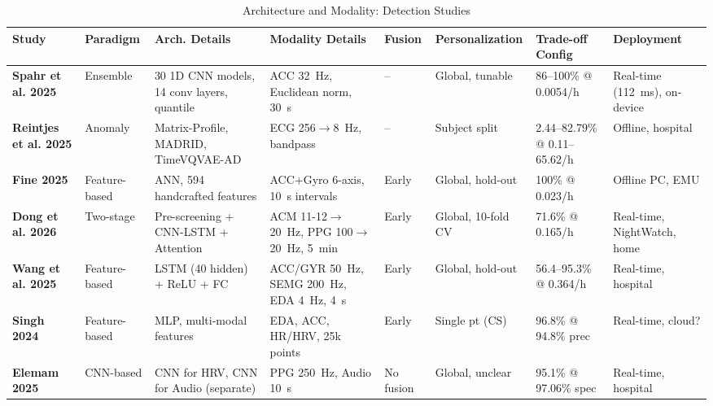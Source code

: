 
\begin{landscape}
\begin{table}[htbp]
\centering
\footnotesize
\caption{Architecture and Modality: Detection Studies}
\label{tab:detection-architecture}
\setlength{\tabcolsep}{3pt}
\renewcommand{\arraystretch}{1.4}
\begin{tabularx}{\linewidth}{@{} l X X X X X X X @{}}
\toprule
\textbf{Study} & \textbf{Paradigm} & \textbf{Arch. Details} & \textbf{Modality Details} & \textbf{Fusion} & \textbf{Personalization} & \textbf{Trade-off Config} & \textbf{Deployment} \\
\midrule
\textbf{Spahr et al. 2025} & Ensemble & 30 1D CNN models, 14 conv layers, quantile & ACC 32~Hz, Euclidean norm, 30~s & -- & Global, tunable & 86--100\% @ 0.0054/h & Real-time (112~ms), on-device \\
\textbf{Reintjes et al. 2025} & Anomaly & Matrix-Profile, MADRID, TimeVQVAE-AD & ECG 256$\to$8~Hz, bandpass & -- & Subject split & 2.44--82.79\% @ 0.11--65.62/h & Offline, hospital \\
\textbf{Fine 2025} & Feature-based & ANN, 594 handcrafted features & ACC+Gyro 6-axis, 10~s intervals & Early & Global, hold-out & 100\% @ 0.023/h & Offline PC, EMU \\
\textbf{Dong et al. 2026} & Two-stage & Pre-screening + CNN-LSTM + Attention & ACM 11-12$\to$20~Hz, PPG 100$\to$20~Hz, 5~min & Early & Global, 10-fold CV & 71.6\% @ 0.165/h & Real-time, NightWatch, home \\
\textbf{Wang et al. 2025} & Feature-based & LSTM (40 hidden) + ReLU + FC & ACC/GYR 50~Hz, SEMG 200~Hz, EDA 4~Hz, 4~s & Early & Global, hold-out & 56.4--95.3\% @ 0.364/h & Real-time, hospital \\
\textbf{Singh 2024} & Feature-based & MLP, multi-modal features & EDA, ACC, HR/HRV, 25k points & Early & Single pt (CS) & 96.8\% @ 94.8\% prec & Real-time, cloud? \\
\textbf{Elemam 2025} & CNN-based & CNN for HRV, CNN for Audio (separate) & PPG 250~Hz, Audio 10~s & No fusion & Global, unclear & 95.1\% @ 97.06\% spec & Real-time, hospital \\

\end{tabularx}
\end{table}
\end{landscape}
